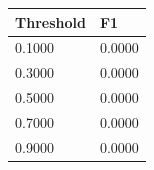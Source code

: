 \begin{tabular}{ll}
\toprule
Threshold & F1 \\
\midrule
0.1000 & 0.0000 \\
0.3000 & 0.0000 \\
0.5000 & 0.0000 \\
0.7000 & 0.0000 \\
0.9000 & 0.0000 \\
\bottomrule
\end{tabular}
